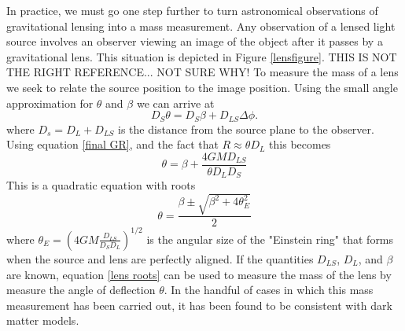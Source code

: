 \documentclass[a4paper,12pt]{article}
\begin{document}
In practice, we must go one step further to turn astronomical observations of gravitational lensing into a mass measurement.  Any observation of a lensed light source involves an observer viewing an image of the object after it passes by a gravitational lens.  This situation is depicted in Figure \ref{lensfigure}. THIS IS NOT THE RIGHT REFERENCE... NOT SURE WHY! To measure the mass of a lens we seek to relate the source position to the image position. Using the small angle approximation for $\theta$ and $\beta$ we can arrive at
\begin{equation} \label{lens eq 1}
D_S \theta = D_S\beta + D_{LS} \Delta \phi.
\end{equation}
where $D_s=D_L+D_{LS}$ is the distance from the source plane to the observer.  Using equation \ref{final GR}, and the fact that $R \approx \theta D_L$ this becomes
\begin{equation} \label{lens eq 2}
\theta = \beta + \frac{4GM D_{LS}}{\theta D_L D_S}
\end{equation}
This is a quadratic equation with roots
\begin{equation} \label{lens roots}
\theta = \frac{ \beta \pm \sqrt{ \beta^2 + 4 \theta^2_E}}{2}
\end{equation}
where $\theta_E = (4GM \frac{D_{LS}}{D_S D_L})^{1/2}$ is the angular size of the "Einstein ring" that forms when the source and lens are perfectly aligned.  If the quantities $D_{LS}$, $D_L$, and $\beta$ are known, equation \ref{lens roots} can be used to measure the mass of the lens by measure the angle of deflection $\theta$. \cite{Bin-Nun} In the handful of cases in which this mass measurement has been carried out, it has been found to be consistent with dark matter models. \cite{Xiang} %
\end{document}
